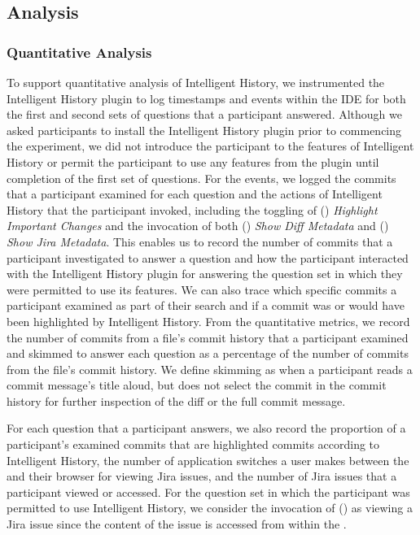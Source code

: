 \subsection{Analysis}

\subsubsection{Quantitative Analysis}

To support quantitative analysis of Intelligent History, 
we instrumented the Intelligent History plugin to log timestamps and events  within the IDE
for both the first and second sets of questions that a participant answered.
Although we asked participants to install the Intelligent History plugin prior to commencing the
experiment, we did not introduce the participant to the features of Intelligent History 
or permit the participant to use any features from the plugin until completion of the first set of questions.
For the events, we logged the commits that a participant examined for each question 
and the actions of Intelligent History that the participant invoked,
including the toggling of () \textit{Highlight Important Changes} 
and the invocation of both () \textit{Show Diff Metadata} and () \textit{Show Jira Metadata}.
This enables us to record the number of commits that a participant investigated to answer a question 
and how the participant interacted with the Intelligent History plugin for answering the question set in which they were permitted to use its features.
We can also trace which specific commits a participant examined as part of their search and if a commit was 
or would have been highlighted by Intelligent History.
From the quantitative metrics, we record the number of commits from a file's commit history that a participant examined 
and skimmed to answer each question as a percentage of the number of commits from the file's commit history.
We define skimming as when a participant reads a commit message's title aloud, but does not select the commit in the commit history
for further inspection of the diff or the full commit message.

For each question that a participant answers, we also record the proportion of a participant's examined commits 
that are highlighted commits according to Intelligent History,
the number of application switches a user makes between the  and their browser for viewing Jira issues,
and the number of Jira issues that a participant viewed or accessed.
For the question set in which the participant was permitted to use Intelligent History, 
we consider the invocation of () as viewing a Jira issue since the content of the issue is accessed from within the .

